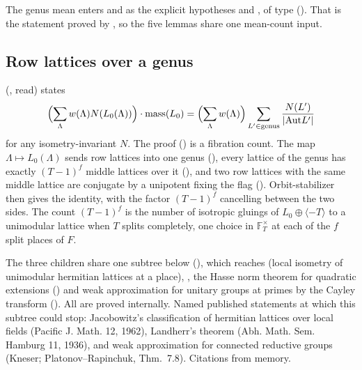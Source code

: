 \documentclass[11pt]{article}
\begin{document}
The genus mean enters  and  as the explicit hypotheses  and , of type  (). That is the statement proved by , so the five lemmas share one mean-count input.

\subsection{Row lattices over a genus}

 (, read) states
\[
\Bigl(\sum_{\Lambda}w(\Lambda)N(L_0(\Lambda))\Bigr)\cdot\mathrm{mass}(L_0)=\Bigl(\sum_\Lambda w(\Lambda)\Bigr)\sum_{L'\in\mathrm{genus}}\frac{N(L')}{|\mathrm{Aut}L'|}
\]
for any isometry-invariant $N$. The proof () is a fibration count. The map $\Lambda\mapsto L_0(\Lambda)$ sends row lattices into one genus (), every lattice of the genus has exactly $(T-1)^f$ middle lattices over it (), and two row lattices with the same middle lattice are conjugate by a unipotent fixing the flag (). Orbit-stabilizer then gives the identity, with the factor $(T-1)^f$ cancelling between the two sides. The count $(T-1)^f$ is the number of isotropic gluings of $L_0\oplus\langle-T\rangle$ to a unimodular lattice when $T$ splits completely, one choice in $\mathbb F_T^\times$ at each of the $f$ split places of $F$.

The three children share one subtree below  (), which reaches  (local isometry of unimodular hermitian lattices at a place), , the Hasse norm theorem for quadratic extensions () and weak approximation for unitary groups at primes by the Cayley transform (). All are proved internally. Named published statements at which this subtree could stop: Jacobowitz's classification of hermitian lattices over local fields (Pacific J. Math. 12, 1962), Landherr's theorem (Abh. Math. Sem. Hamburg 11, 1936), and weak approximation for connected reductive groups (Kneser; Platonov--Rapinchuk, Thm.~7.8). Citations from memory.
\end{document}
